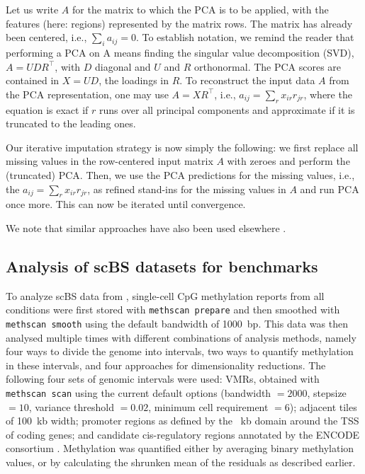 \documentclass[10pt]{article}
\begin{document}
Let us write $A$ for the matrix to which the PCA is to be applied, with the features (here: regions) represented by the matrix rows.
The matrix has already been centered, i.e., $\sum_i a_{ij}=0$.
To establish notation, we remind the reader that performing a PCA on A means finding the singular value decomposition (SVD), $A=UDR^\top$, with $D$ diagonal and $U$ and $R$ orthonormal.
The PCA scores are contained in $X=UD$, the loadings in $R$.
To reconstruct the input data $A$ from the PCA representation, one may use $A=XR^\top$, i.e., $a_{ij}=\sum_r x_{ir} r_{jr}$, where the equation is exact if $r$ runs over all principal components and approximate if it is truncated to the leading ones.

Our iterative imputation strategy is now simply the following: we first replace all missing values in the row-centered input matrix $A$ with zeroes and perform the (truncated) PCA.
Then, we use the PCA predictions for the missing values, i.e., the $a_{ij}=\sum_r x_{ir} r_{jr}$, as refined stand-ins for the missing values in $A$ and run PCA once more.
This can now be iterated until convergence.

We note that similar approaches have also been used elsewhere \citep{josse2012}.


\subsection*{Analysis of scBS datasets for benchmarks}
To analyze scBS data from \citet{kremer_scnmt}, single-cell CpG methylation reports from all conditions were first stored with \texttt{methscan prepare} and then smoothed with \texttt{methscan smooth} using the default bandwidth of 1000~bp.
This data was then analysed multiple times with different combinations of analysis methods, namely four ways to divide the genome into intervals, two ways to quantify methylation in these intervals, and four approaches for dimensionality reductions.
The following four sets of genomic intervals were used:
VMRs, obtained with \texttt{methscan scan} using the current default options (bandwidth $=2000$, stepsize $=10$, variance threshold $= 0.02$, minimum cell requirement $=6$);
adjacent tiles of 100~kb width;
promoter regions as defined by the ~kb domain around the TSS of coding genes;
and candidate cis-regulatory regions annotated by the ENCODE consortium \citep{encode2020expanded}.
Methylation was quantified either by averaging binary methylation values, or by calculating the shrunken mean of the residuals as described earlier.
\end{document}
